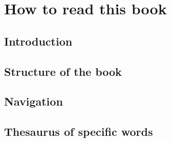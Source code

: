 \section{How to read this book}
	\subsection{Introduction}
	
	
	\subsection{Structure of the book}
		
		
	\subsection{Navigation}
	
	
	\subsection{Thesaurus of specific words}
\newpage	